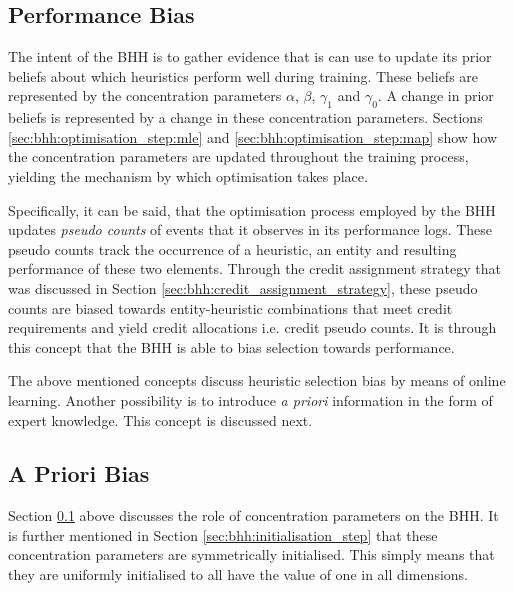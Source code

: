 \subsection{Performance Bias}
\label{sec:bhh:optimisation_step:performance_bias}

The intent of the \ac{BHH} is to gather evidence that is can use to update its prior beliefs about which heuristics perform well during training. These beliefs are represented by the concentration parameters $\alpha$, $\beta$, $\gamma_{1}$ and $\gamma_{0}$. A change in prior beliefs is represented by a change in these concentration parameters. Sections \ref{sec:bhh:optimisation_step:mle} and \ref{sec:bhh:optimisation_step:map} show how the concentration parameters are updated throughout the training process, yielding the mechanism by which optimisation takes place. 

Specifically, it can be said, that the optimisation process employed by the \ac{BHH} updates \textit{pseudo counts} of events that it observes in its performance logs. These pseudo counts track the occurrence of a heuristic, an entity and resulting performance of these two elements. Through the credit assignment strategy that was discussed in Section \ref{sec:bhh:credit_assignment_strategy}, these pseudo counts are biased towards entity-heuristic combinations that meet credit requirements and yield credit allocations i.e. credit pseudo counts. It is through this concept that the \ac{BHH} is able to bias selection towards performance.

The above mentioned concepts discuss heuristic selection bias by means of online learning. Another possibility is to introduce \textit{a priori} information in the form of expert knowledge. This concept is discussed next.

\subsection{A Priori Bias}
\label{sec:bhh:optimisation_step:a_priori_bias}

Section \ref{sec:bhh:optimisation_step:performance_bias} above discusses the role of concentration parameters on the \ac{BHH}. It is further mentioned in Section \ref{sec:bhh:initialisation_step} that these concentration parameters are symmetrically initialised. This simply means that they are uniformly initialised to all have the value of one in all dimensions.

